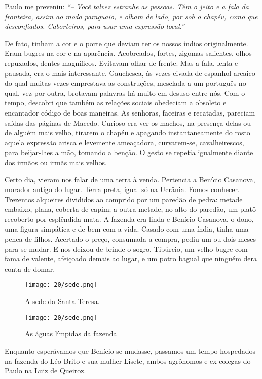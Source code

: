 Paulo me preveniu: 
\textit{``-- Você talvez estranhe as pessoas.
Têm o jeito e a fala da fronteira, assim ao modo paraguaio, e olham de lado, por sob o chapéu, como que desconfiados.
Caborteiros, para usar uma expressão local.'' }

De fato, tinham a cor e o porte que deviam ter os nossos índios originalmente.
Eram bugres na cor e na aparência.
Acobreados, fortes, zigomas salientes, olhos repuxados, dentes magníficos.
Evitavam olhar de frente.
Mas a fala, lenta e pausada, era o mais interessante.
Gauchesca, às vezes eivada de espanhol arcaico do qual muitas vezes emprestava as construções, mesclada a um português no qual, vez por outra, brotavam palavras há muito em desuso entre nós.
Com o tempo, descobri que também as relações sociais obedeciam a obsoleto e encantador código de boas maneiras.
As senhoras, faceiras e recatadas, pareciam saídas das páginas de Macedo.
Curioso era ver os machos, na presença delas ou de alguém mais velho, tirarem o chapéu e apagando instantaneamente do rosto aquela expressão arisca e levemente ameaçadora, curvarem-se, cavalheirescos, para beijar-lhes a mão, tomando a benção.
O gesto se repetia igualmente diante dos irmãos ou irmãs mais velhos.

Certo dia, vieram nos falar de uma terra à venda.
Pertencia a Benício Casanova, morador antigo do lugar.
Terra preta, igual só na Ucrânia.
Fomos conhecer.
Trezentos alqueires divididos ao comprido por um paredão de pedra: metade embaixo, plana, coberta de capim; a outra metade, no alto do paredão, um platô recoberto por esplêndida mata.
A fazenda era linda e Benício Casanova, o dono, uma figura simpática e de bem com a vida.
Casado com uma índia, tinha uma penca de filhos.
Acertado o preço, consumada a compra, pediu um ou dois meses para se mudar.
E nos deixou de brinde o sogro, Tibúrcio, um velho bugre com fama de valente, afeiçoado demais ao lugar, e um potro bagual que ninguém dera conta de domar.

\begin{figure}
\centering
\texttt{[image: 20/sede.png]}
\caption{A sede da Santa Teresa.}
\end{figure}

\begin{figure}
\centering
\texttt{[image: 20/sede.png]}
\caption{As águas límpidas da fazenda}
\end{figure}

Enquanto esperávamos que Benício se mudasse, passamos um tempo hospedados na fazenda do Léo Brito e sua mulher Lisete, ambos agrônomos e ex-colegas do Paulo na Luiz de Queiroz.
